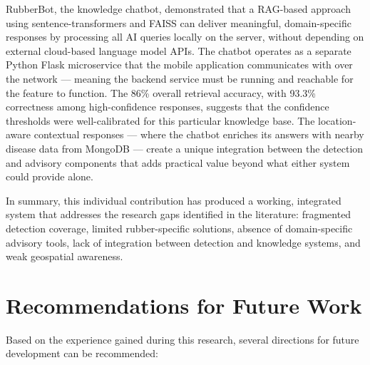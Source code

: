 RubberBot, the knowledge chatbot, demonstrated that a RAG-based approach using sentence-transformers and FAISS can deliver meaningful, domain-specific responses by processing all AI queries locally on the server, without depending on external cloud-based language model APIs. The chatbot operates as a separate Python Flask microservice that the mobile application communicates with over the network --- meaning the backend service must be running and reachable for the feature to function. The 86\% overall retrieval accuracy, with 93.3\% correctness among high-confidence responses, suggests that the confidence thresholds were well-calibrated for this particular knowledge base. The location-aware contextual responses --- where the chatbot enriches its answers with nearby disease data from MongoDB --- create a unique integration between the detection and advisory components that adds practical value beyond what either system could provide alone.

In summary, this individual contribution has produced a working, integrated system that addresses the research gaps identified in the literature: fragmented detection coverage, limited rubber-specific solutions, absence of domain-specific advisory tools, lack of integration between detection and knowledge systems, and weak geospatial awareness.

\section{Recommendations for Future Work}

Based on the experience gained during this research, several directions for future development can be recommended:


